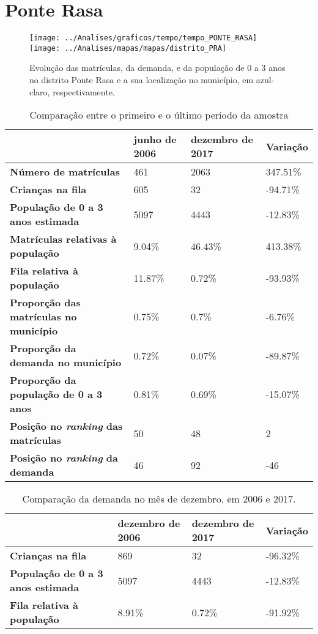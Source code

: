 \section{Ponte Rasa}
\begin{figure}[H]
\centering
\texttt{[image: ../Analises/graficos/tempo/tempo\_PONTE\_RASA]}
\texttt{[image: ../Analises/mapas/mapas/distrito\_PRA]}
\caption{Evolução das matrículas, da demanda, e da população de 0 a 3 anos no distrito Ponte Rasa e a sua localização no município, em azul-claro, respectivamente.}
\end{figure}
\begin{table}[H]
\begin{tabular}{l|l|l|l}
\textbf{}                                      & \textbf{junho de 2006}       & \textbf{dezembro de 2017}    & \textbf{Variação} \\ \hline
\textbf{Número de matrículas}                  & 461 & 2063 & 347.51\% \\ \hline
\textbf{Crianças na fila}                      & 605 & 32 & -94.71\% \\ \hline
\textbf{População de 0 a 3 anos estimada}      & 5097 & 4443 & -12.83\% \\ \hline
\textbf{Matrículas relativas à população}      & 9.04\% & 46.43\% & 413.38\% \\ \hline
\textbf{Fila relativa à população}             & 11.87\% & 0.72\% & -93.93\% \\ \hline
\textbf{Proporção das matrículas no município} & 0.75\% & 0.7\% & -6.76\% \\ \hline
\textbf{Proporção da demanda no município}     & 0.72\% & 0.07\% & -89.87\% \\ \hline
\textbf{Proporção da população de 0 a 3 anos}  & 0.81\% & 0.69\% & -15.07\% \\ \hline
\textbf{Posição no \textit{ranking} das matrículas}     & 50 & 48 & 2 \\ \hline
\textbf{Posição no \textit{ranking} da demanda}         & 46 & 92 & -46 \\ 
\end{tabular}
\caption{Comparação entre o primeiro e o último período da amostra}
\end{table}
\begin{table}[H]
\begin{tabular}{l|l|l|l}
\textbf{}                                 & \textbf{dezembro de 2006} & \textbf{dezembro de 2017} & \textbf{Variação} \\ \hline
\textbf{Crianças na fila}                      & 869 & 32 & -96.32\% \\ \hline
\textbf{População de 0 a 3 anos estimada}      & 5097 & 4443 & -12.83\% \\ \hline
\textbf{Fila relativa à população}             & 8.91\% & 0.72\% & -91.92\% \\
\end{tabular}
\caption{Comparação da demanda no mês de dezembro, em 2006 e 2017.}
\end{table}

